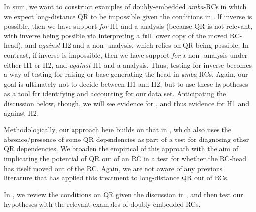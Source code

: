 \documentclass[output=paper,modfonts,nonflat,
colorlinks, citecolor=brown,
]{langsci/langscibook}
\begin{document}
\largerpage[-2]
In sum, we want to construct examples of doubly-embedded \textit{amba}{}-RCs in which we expect long-distance QR to be impossible given the conditions in \citet{Fox2000}. If inverse  is possible, then we have support \textit{for} H1 and a  analysis (because QR is not relevant, with inverse  being possible via interpreting a full lower copy of the moved RC-head), and \textit{against} H2 and a non- analysis, which relies on QR being possible. In contrast, if inverse  is impossible, then we have support \textit{for} a non- analysis under either H1 or H2, and \textit{against} H1 and a  analysis. Thus, testing for inverse  becomes a way of testing for raising or base-generating the head in \textit{amba}{}-RCs. Again, our goal is ultimately not to decide between H1 and H2, but to use these hypotheses as a tool for identifying  and accounting for our data set. Anticipating the discussion below, though, we will see evidence for , and thus evidence for H1 and against H2.

Methodologically, our approach here builds on that in \citet{Fox2000}, which also uses the absence/presence of some QR dependencies as part of a test for diagnosing other QR dependencies. We broaden the empirical  of this approach with the aim of implicating the potential of QR out of an RC in a test for whether the RC-head has itself moved out of the RC. Again, we are not aware of any previous literature that has applied this treatment to long-distance QR out of RCs. 

In , we review the conditions on QR given the discussion in \citet{Fox2000}, and then test our hypotheses with the relevant examples of doubly-embedded RCs.
\end{document}
